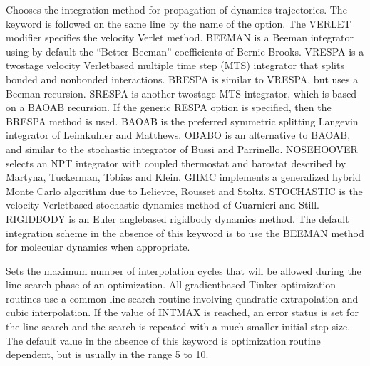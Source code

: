 \documentclass[letterpaper,11pt,english]{sphinxmanual}
\begin{document}
\ignorespaces {}\label{\detokenize{text/keywords:key-integrator}}\begin{description}
\sphinxAtStartPar
Chooses the integration method for propagation of dynamics trajectories. The keyword is followed on the same line by the name of the option. The VERLET modifier specifies the velocity Verlet method. BEEMAN is a Beeman integrator using by default the “Better Beeman” coefficients of Bernie Brooks. VRESPA is a two\sphinxhyphen{}stage velocity Verlet\sphinxhyphen{}based multiple time step (MTS) integrator that splits bonded and nonbonded interactions. BRESPA is similar to VRESPA, but uses a Beeman recursion. SRESPA is another two\sphinxhyphen{}stage MTS integrator, which is based on a BAOAB recursion. If the generic RESPA option is specified, then the BRESPA method is used. BAOAB is the preferred symmetric splitting Langevin integrator of Leimkuhler and Matthews. OBABO is an alternative to BAOAB, and similar to the stochastic integrator of Bussi and Parrinello. NOSE\sphinxhyphen{}HOOVER selects an NPT integrator with coupled thermostat and barostat described by Martyna, Tuckerman, Tobias and Klein. GHMC implements a generalized hybrid Monte Carlo algorithm due to Lelievre, Rousset and Stoltz. STOCHASTIC is the velocity Verlet\sphinxhyphen{}based stochastic dynamics method of Guarnieri and Still. RIGIDBODY is an Euler angle\sphinxhyphen{}based rigid\sphinxhyphen{}body dynamics method. The default integration scheme in the absence of this keyword is to use the BEEMAN method for molecular dynamics when appropriate.

\end{description}

\ignorespaces {}\label{\detokenize{text/keywords:key-intmax}}\begin{description}
\sphinxAtStartPar
Sets the maximum number of interpolation cycles that will be allowed during the line search phase of an optimization. All gradient\sphinxhyphen{}based Tinker optimization routines use a common line search routine involving quadratic extrapolation and cubic interpolation. If the value of INTMAX is reached, an error status is set for the line search and the search is repeated with a much smaller initial step size. The default value in the absence of this keyword is optimization routine dependent, but is usually in the range 5 to 10.

\end{description}
\end{document}
